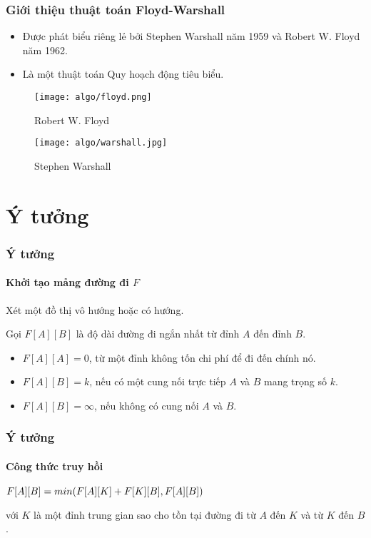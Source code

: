 \documentclass[12pt]{beamer}
\begin{document}
    \begin{frame}[t]
        \frametitle{Giới thiệu thuật toán Floyd-Warshall}

        \begin{itemize}
            \item Được phát biểu riêng lẻ bởi Stephen Warshall năm 1959\cite{10.1145/321105.321107} và Robert W. Floyd năm 1962\cite{10.1145/367766.368168}.\pause
            \item Là một thuật toán Quy hoạch động tiêu biểu.\pause
        \end{itemize}

        \begin{minipage}{0.45\textwidth}
        \begin{figure}
            \texttt{[image: algo/floyd.png]}
            \caption{Robert W. Floyd}
        \end{figure}\pause
        \end{minipage}
        \begin{minipage}{0.45\textwidth}
        \begin{figure}
            \texttt{[image: algo/warshall.jpg]}
            \caption{Stephen Warshall}
        \end{figure}
        \end{minipage}
    \end{frame}

    \section{Ý tưởng}
    \begin{frame}
        \frametitle{Ý tưởng}
        \framesubtitle{Khởi tạo mảng đường đi $F$}
        Xét một đồ thị vô hướng hoặc có hướng.

        Gọi $ F[A][B] $ là độ dài đường đi ngắn nhất từ đỉnh $ A $ đến đỉnh $ B $.\pause
        \begin{itemize}
            \item $F[A][A] = 0$, từ một đỉnh không tốn chi phí để đi đến chính nó.\pause
            \item $F[A][B] = k$, nếu có một cung nối trực tiếp $ A $ và $ B $ mang trọng số $k$.\pause
            \item $F[A][B] = \infty$, nếu không có cung nối $ A $ và $ B $.
        \end{itemize}
    \end{frame}
    \begin{frame}
    \frametitle{Ý tưởng}
    \framesubtitle{Công thức truy hồi}
    $ \centering F[A][B] = min(F[A][K] + F[K][B], F[A][B])$

    với $ K $ là một đỉnh trung gian sao cho tồn tại đường đi từ $ A $ đến $ K $ và từ $ K $ đến $ B $.
    \end{frame}
\end{document}
